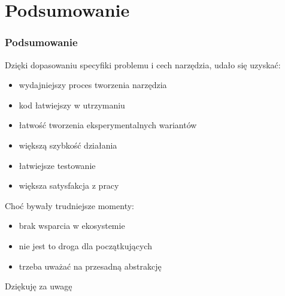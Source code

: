 \documentclass[8pt]{beamer}
\begin{document}
\section{Podsumowanie}

\begin{frame}
  \frametitle{Podsumowanie}

  Dzięki dopasowaniu specyfiki problemu i cech narzędzia, udało się uzyskać:
  \begin{itemize}
  \item wydajniejszy proces tworzenia narzędzia
  \item kod łatwiejszy w utrzymaniu
  \item łatwość tworzenia eksperymentalnych wariantów
  \item większą szybkość działania
  \item łatwiejsze testowanie
  \item większa satysfakcja z pracy
  \end{itemize}

  Choć bywały trudniejsze momenty:
  \begin{itemize}
  \item brak wsparcia w ekosystemie
  \item nie jest to droga dla początkujących
  \item trzeba uważać na przesadną abstrakcję
  \end{itemize}
\end{frame}

\begin{frame}[standout]
  Dziękuję za uwagę
\end{frame}
\end{document}
